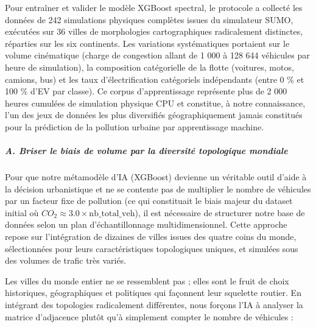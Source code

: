 \documentclass[10pt, a4paper]{article}
\begin{document}
Pour entraîner et valider le modèle XGBoost spectral, le protocole a
collecté les données de 242 simulations physiques complètes issues du
simulateur SUMO, exécutées sur 36 villes de morphologies cartographiques
radicalement distinctes, réparties sur les six continents. Les
variations systématiques portaient sur le volume cinématique (charge de
congestion allant de 1 000 à 128 644 véhicules par heure de simulation),
la composition catégorielle de la flotte (voitures, motos, camions, bus)
et les taux d'électrification catégoriels indépendants (entre 0 \% et
100 \% d'EV par classe). Ce corpus d'apprentissage représente plus de 2
000 heures cumulées de simulation physique CPU et constitue, à notre
connaissance, l'un des jeux de données les plus diversifiés
géographiquement jamais constitués pour la prédiction de la pollution
urbaine par apprentissage machine.

\subparagraph{A. Briser le biais de volume par la diversité topologique
mondiale}\label{a.-briser-le-biais-de-volume-par-la-diversituxe9-topologique-mondiale}

Pour que notre métamodèle d'IA (XGBoost) devienne un véritable outil
d'aide à la décision urbanistique et ne se contente pas de multiplier le
nombre de véhicules par un facteur fixe de pollution (ce qui constituait
le biais majeur du dataset initial où
\(CO_2 \approx 3.0 \times \text{nb\_total\_veh}\)), il est nécessaire de
structurer notre base de données selon un plan d'échantillonnage
multidimensionnel. Cette approche repose sur l'intégration de dizaines
de villes issues des quatre coins du monde, sélectionnées pour leurs
caractéristiques topologiques uniques, et simulées sous des volumes de
trafic très variés.

Les villes du monde entier ne se ressemblent pas ; elles sont le fruit
de choix historiques, géographiques et politiques qui façonnent leur
squelette routier. En intégrant des topologies radicalement différentes,
nous forçons l'IA à analyser la matrice d'adjacence plutôt qu'à
simplement compter le nombre de véhicules :
\end{document}

